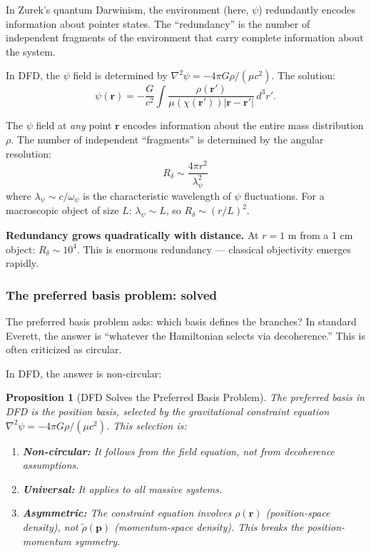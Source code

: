 \documentclass[11pt,a4paper]{article}
\newtheorem{proposition}{Proposition}
\begin{document}
In Zurek's quantum Darwinism, the environment (here, $\psi$) redundantly encodes information about pointer states. The ``redundancy'' is the number of independent fragments of the environment that carry complete information about the system.

In DFD, the $\psi$ field is determined by $\nabla^2\psi = -4\pi G\rho/(\mu c^2)$. The solution:
\begin{equation}
\psi(\mathbf{r}) = -\frac{G}{c^2}\int\frac{\rho(\mathbf{r}')}{\mu(\chi(\mathbf{r}'))|\mathbf{r}-\mathbf{r}'|}\,d^3r'.
\end{equation}

The $\psi$ field at \emph{any} point $\mathbf{r}$ encodes information about the entire mass distribution $\rho$. The number of independent ``fragments'' is determined by the angular resolution:
\begin{equation}
R_\delta \sim \frac{4\pi r^2}{\lambda_\psi^2}
\end{equation}
where $\lambda_\psi \sim c/\omega_\psi$ is the characteristic wavelength of $\psi$ fluctuations. For a macroscopic object of size $L$: $\lambda_\psi \sim L$, so $R_\delta \sim (r/L)^2$.

\textbf{Redundancy grows quadratically with distance.} At $r = 1$ m from a 1 cm object: $R_\delta \sim 10^4$. This is enormous redundancy --- classical objectivity emerges rapidly.

\subsubsection{The preferred basis problem: solved}

The preferred basis problem asks: which basis defines the branches? In standard Everett, the answer is ``whatever the Hamiltonian selects via decoherence.'' This is often criticized as circular.

In DFD, the answer is non-circular:

\begin{proposition}[DFD Solves the Preferred Basis Problem]
The preferred basis in DFD is the \emph{position basis}, selected by the gravitational constraint equation $\nabla^2\psi = -4\pi G\rho/(\mu c^2)$. This selection is:
\begin{enumerate}
\item \textbf{Non-circular:} It follows from the field equation, not from decoherence assumptions.
\item \textbf{Universal:} It applies to all massive systems.
\item \textbf{Asymmetric:} The constraint equation involves $\rho(\mathbf{r})$ (position-space density), not $\tilde\rho(\mathbf{p})$ (momentum-space density). This breaks the position-momentum symmetry.
\end{enumerate}
\end{proposition}
\end{document}
